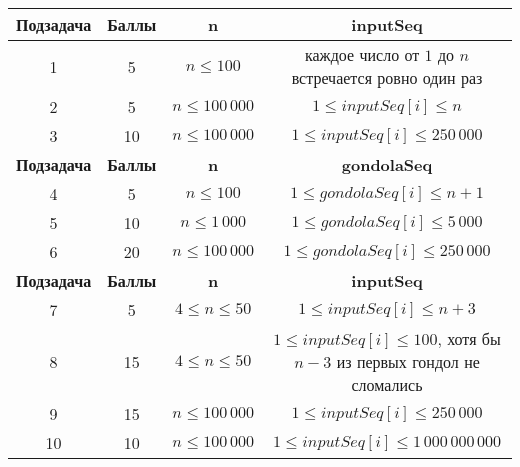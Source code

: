 \begin{center}
\renewcommand{\arraystretch}{1.5}
\begin{tabular}{|c|c|c|c|}
\hline
\textbf{Подзадача} & \textbf{Баллы} &  \textbf{n} & \textbf{inputSeq} \\
\hline
1 &  5 & $n \le 100$ & каждое число от $1$ до $n$ встречается ровно один раз\\
\hline
2 & 5 &  $n \le 100\,000$ & $1 \le inputSeq[i] \le n$ \\
\hline
3 & 10 & $n \le 100\,000$ & $1 \le inputSeq[i] \le 250\,000$ \\
\hline
\textbf{Подзадача} & \textbf{Баллы} &  \textbf{n} & \textbf{gondolaSeq} \\
\hline
4 & 5 & $n \le 100$ & $1 \le gondolaSeq[i] \le n + 1$ \\
\hline
5 & 10 & $n \le 1\,000$ & $1 \le gondolaSeq[i] \le 5\,000$ \\
\hline
6 & 20 & $n \le 100\,000$ & $1 \le gondolaSeq[i] \le 250\,000$\\
\hline
\textbf{Подзадача} & \textbf{Баллы} &  \textbf{n} & \textbf{inputSeq} \\
\hline
7 & 5 & $4 \le n \le 50$ & $1 \le inputSeq[i] \le n + 3$\\
\hline
8 & 15 & $4 \le n \le 50$ & $1 \le inputSeq[i] \le 100$, хотя бы $n - 3$ из первых
гондол не сломались \\
\hline
9 & 15 & $n \le 100\,000$ & $1 \le inputSeq[i] \le 250\,000$ \\
\hline
10 & 10 & $n \le 100\,000$ & $1 \le inputSeq[i] \le 1\,000\,000\,000$ \\
\hline
\end{tabular}
\end{center}